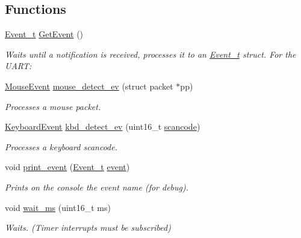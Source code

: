 \subsection*{Functions}
\begin{DoxyCompactItemize}
\item 
\mbox{\hyperlink{struct_event__t}{Event\+\_\+t}} \mbox{\hyperlink{group__event_ga34dd154f7f761279e2526c29360523a8}{Get\+Event}} ()
\begin{DoxyCompactList}\small\item\em Waits until a notification is received, processes it to an \mbox{\hyperlink{struct_event__t}{Event\+\_\+t}} struct. For the U\+A\+RT\+: \end{DoxyCompactList}\item 
\mbox{\hyperlink{struct_mouse_event}{Mouse\+Event}} \mbox{\hyperlink{group__event_ga556d3da45a1dc6de5d205d92b4b275b3}{mouse\+\_\+detect\+\_\+ev}} (struct packet $\ast$pp)
\begin{DoxyCompactList}\small\item\em Processes a mouse packet. \end{DoxyCompactList}\item 
\mbox{\hyperlink{struct_keyboard_event}{Keyboard\+Event}} \mbox{\hyperlink{group__event_ga971796fc84ffc34d36bcb9d073a94e31}{kbd\+\_\+detect\+\_\+ev}} (uint16\+\_\+t \mbox{\hyperlink{keyboard_8c_ad02fcede5beda1de5da3bc015d0b8927}{scancode}})
\begin{DoxyCompactList}\small\item\em Processes a keyboard scancode. \end{DoxyCompactList}\item 
void \mbox{\hyperlink{group__event_gad74e39179573fc99ba50e3dddef67ac5}{print\+\_\+event}} (\mbox{\hyperlink{struct_event__t}{Event\+\_\+t}} \mbox{\hyperlink{pengoo_8c_af662780d461acf9ac3b1321884e7cb01}{event}})
\begin{DoxyCompactList}\small\item\em Prints on the console the event name (for debug). \end{DoxyCompactList}\item 
void \mbox{\hyperlink{group__event_ga4e73585bc921a75ae4b4cac67b718d67}{wait\+\_\+ms}} (uint16\+\_\+t ms)
\begin{DoxyCompactList}\small\item\em Waits. (Timer interrupts must be subscribed) \end{DoxyCompactList}\end{DoxyCompactItemize}
